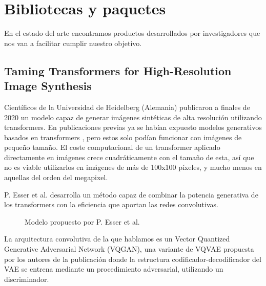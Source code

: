 \newpage
\section{Bibliotecas y paquetes}
En el estado del arte encontramos productos desarrollados por investigadores que nos van a facilitar cumplir nuestro objetivo. 

\subsection{Taming Transformers for High-Resolution Image Synthesis}
Científicos de la Universidad de Heidelberg (Alemania) publicaron a finales de 2020 un modelo capaz de generar imágenes sintéticas de alta resolución utilizando transformers. En publicaciones previas ya se habían expuesto modelos generativos basados en transformers \cite{chen2020generative}, pero estos solo podían funcionar con imágenes de pequeño tamaño. El coste computacional de un transformer aplicado directamente en imágenes crece cuadráticamente con el tamaño de esta, así que no es viable utilizarlos en imágenes de más de 100x100 píxeles, y mucho menos en aquellas del orden del megapixel.

P. Esser et al. \cite{esser2021taming} desarrolla un método capaz de combinar la potencia generativa de los transformers con la eficiencia que aportan las redes convolutivas. 

\begin{figure}[H]
\centering
    \caption{Modelo propuesto por P. Esser et al. \cite{esser2021taming}}
\end{figure}

La arquitectura convolutiva de la que hablamos es un Vector Quantized Generative Adversarial Network (VQGAN), una variante de VQVAE propuesta por los autores de la publicación donde la estructura codificador-decodificador del VAE se entrena mediante un procedimiento adversarial, utilizando un discriminador.

